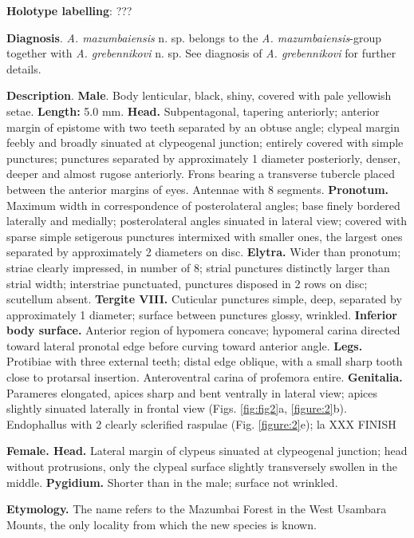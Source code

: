 \documentclass[fleqn,10pt,lineno]{wlpeerj}
\begin{document}
\textbf{Holotype labelling}: ???

\textbf{Diagnosis}. \textit{A. mazumbaiensis} n. sp. belongs to the \textit{A. mazumbaiensis}-group together with \textit{A. grebennikovi} n. sp. See diagnosis of \textit{A. grebennikovi} for further details.

\textbf{Description}. \textbf{Male}. Body lenticular, black, shiny, covered with pale yellowish setae. \textbf{Length:} 5.0 mm. \textbf{Head.} Subpentagonal, tapering anteriorly; anterior margin of epistome with two teeth separated by an obtuse angle; clypeal margin feebly and broadly sinuated at clypeogenal junction; entirely covered with simple punctures; punctures separated by approximately 1 diameter posteriorly, denser, deeper and almost rugose anteriorly. Frons bearing a transverse tubercle placed between the anterior margins of eyes. Antennae with 8 segments. \textbf{Pronotum.} Maximum width in correspondence of posterolateral angles; base finely bordered laterally and medially; posterolateral angles sinuated in lateral view; covered with sparse simple setigerous punctures intermixed with smaller ones, the largest ones separated by approximately 2 diameters on disc. \textbf{Elytra.} Wider than pronotum; striae clearly impressed, in number of 8; strial punctures distinctly larger than strial width; interstriae punctuated, punctures disposed in 2 rows on disc; scutellum absent. \textbf{Tergite VIII.} Cuticular punctures simple, deep, separated by approximately 1 diameter; surface between punctures glossy, wrinkled. \textbf{Inferior body surface.} Anterior region of hypomera concave; hypomeral carina directed toward lateral pronotal edge before curving toward anterior angle. \textbf{Legs.} Protibiae with three external teeth; distal edge oblique, with a small sharp tooth close to protarsal insertion. Anteroventral carina of profemora entire. \textbf{Genitalia.} Parameres elongated, apices sharp and bent ventrally in lateral view; apices slightly sinuated laterally in frontal view (Figs. \ref{fig:fig2}a, \ref{figure:2}b). Endophallus with 2 clearly sclerified raspulae (Fig. \ref{figure:2}e); la
XXX FINISH

\textbf{Female. Head.} Lateral margin of clypeus sinuated at clypeogenal junction; head without protrusions, only the clypeal surface slightly transversely swollen in the middle. \textbf{Pygidium.} Shorter than in the male; surface not wrinkled.

\textbf{Etymology.} The name refers to the Mazumbai Forest in the West Usambara Mounts, the only locality from which the new species is known.
\end{document}
